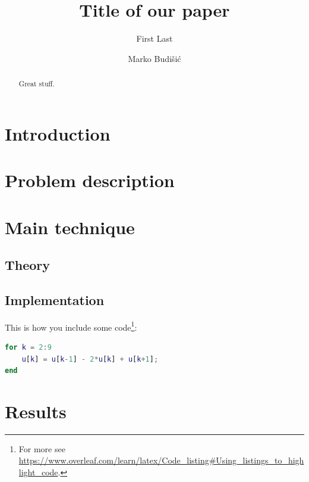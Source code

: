 \documentclass{amsart}
\begin{document}
\title{Title of our paper}

\author{First Last}
\address{Department of Mathematics, Clarkson University,
Potsdam, NY}

\author{Marko Budi\v{s}i\'c}
\address{Department of Mathematics, Clarkson University,
Potsdam, NY}

\begin{abstract}
Great stuff.
\end{abstract}

\maketitle %
\tableofcontents %

\section{Introduction}

\section{Problem description}

\section{Main technique}

\subsection{Theory}

\subsection{Implementation}

This is how you include some code\footnote{For more see \url{https://www.overleaf.com/learn/latex/Code_listing\#Using_listings_to_highlight_code}.}:
\begin{lstlisting}[language=Matlab]
for k = 2:9
    u[k] = u[k-1] - 2*u[k] + u[k+1];
end
\end{lstlisting}

\section{Results}
\end{document}
